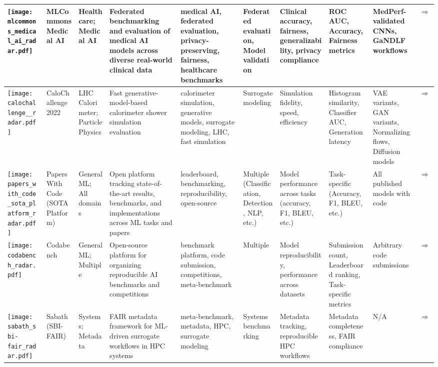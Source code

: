 \begin{landscape}
{\begin{longtable}{|p{}|p{}|p{}|p{}|p{}|p{}|p{}|p{}|p{}|p{}|}
\texttt{[image: mlcommons\_medical\_ai\_radar.pdf]} & MLCommons Medical AI & Healthcare; Medical AI & Federated benchmarking and evaluation of medical AI models across diverse real-world clinical data & medical AI, federated evaluation, privacy-preserving, fairness, healthcare benchmarks & Federated evaluation, Model validation & Clinical accuracy, fairness, generalizability, privacy compliance & ROC AUC, Accuracy, Fairness metrics & MedPerf-validated CNNs, GaNDLF workflows & \cite{karargyris2023federated}\href{https://github.com/mlcommons/medical}{$\Rightarrow$} \\ \hline
\texttt{[image: calochallenge\_\_radar.pdf]} & CaloChallenge 2022 & LHC Calorimeter; Particle Physics & Fast generative-model-based calorimeter shower simulation evaluation & calorimeter simulation, generative models, surrogate modeling, LHC, fast simulation & Surrogate modeling & Simulation fidelity, speed, efficiency & Histogram similarity, Classifier AUC, Generation latency & VAE variants, GAN variants, Normalizing flows, Diffusion models & \cite{krause2024calochallenge2022communitychallenge}\href{http://arxiv.org/abs/2410.21611}{$\Rightarrow$} \\ \hline
\texttt{[image: papers\_with\_code\_sota\_platform\_radar.pdf]} & Papers With Code (SOTA Platform) & General ML; All domains & Open platform tracking state-of-the-art results, benchmarks, and implementations across ML tasks and papers & leaderboard, benchmarking, reproducibility, open-source & Multiple (Classification, Detection, NLP, etc.) & Model performance across tasks (accuracy, F1, BLEU, etc.) & Task-specific (Accuracy, F1, BLEU, etc.) & All published models with code & \cite{pmlr-v37-blum15}\href{https://paperswithcode.com/sota}{$\Rightarrow$} \\ \hline
\texttt{[image: codabench\_radar.pdf]} & Codabench & General ML; Multiple & Open-source platform for organizing reproducible AI benchmarks and competitions & benchmark platform, code submission, competitions, meta-benchmark & Multiple & Model reproducibility, performance across datasets & Submission count, Leaderboard ranking, Task-specific metrics & Arbitrary code submissions & \cite{xu-2022}\href{https://www.codabench.org/}{$\Rightarrow$} \\ \hline
\texttt{[image: sabath\_sbi-fair\_radar.pdf]} & Sabath (SBI-FAIR) & Systems; Metadata & FAIR metadata framework for ML-driven surrogate workflows in HPC systems & meta-benchmark, metadata, HPC, surrogate modeling & Systems benchmarking & Metadata tracking, reproducible HPC workflows & Metadata completeness, FAIR compliance & N/A & \cite{luszczek2021sabath}\href{https://sbi-fair.github.io/docs/software/sabath/}{$\Rightarrow$} \\ \hline

\end{longtable}}
\end{landscape}
